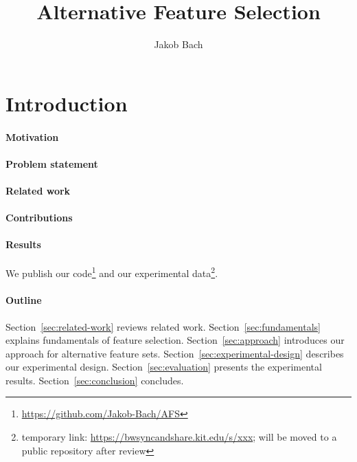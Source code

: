 \documentclass{article}
\title{Alternative Feature Selection}
\author{Jakob Bach}
\theoremstyle{definition}
\begin{document}
\maketitle

\begin{abstract}
\end{abstract}

\section{Introduction}
\label{sec:introduction}

\paragraph{Motivation}

\paragraph{Problem statement}

\paragraph{Related work}

\paragraph{Contributions}

\paragraph{Results}

We publish our code\footnote{\url{https://github.com/Jakob-Bach/AFS}} and our experimental data\footnote{temporary link: \url{https://bwsyncandshare.kit.edu/s/xxx}; will be moved to a public repository after review}.

\paragraph{Outline}

Section~\ref{sec:related-work} reviews related work.
Section~\ref{sec:fundamentals} explains fundamentals of feature selection.
Section~\ref{sec:approach} introduces our approach for alternative feature sets.
Section~\ref{sec:experimental-design} describes our experimental design.
Section~\ref{sec:evaluation} presents the experimental results.
Section~\ref{sec:conclusion} concludes.
\end{document}
